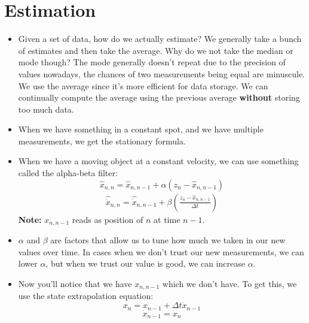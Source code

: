 \documentclass[a4paper, 11pt]{article}
\begin{document}
	\section{Estimation}
	\begin{itemize}
		\item Given a set of data, how do we actually estimate? We generally take a bunch of estimates and then take the average. Why do we not take the median or mode though?
		\subitem The mode generally doesn't repeat due to the precision of values nowadays, the chances of two measurements being equal are minuscule. 
		\subitem We use the average since it's more efficient for data storage. We can continually compute the average using the previous average \textbf{without} storing too much data.
		\item When we have something in a constant spot, and we have multiple measurements, we get the stationary formula.
		\item When we have a moving object at a constant velocity, we can use something called the alpha-beta filter:
		\begin{equation}
			\hat{x}_{n,n} = \hat{x}_{n,n-1} + \alpha (z_n-\hat{x}_{n,n-1})
		\end{equation}
		\begin{equation}
			\begin{split}
				\hat{\dot{x}}_{n,n} = \hat{\dot{x}}_{n,n-1} + \beta\left(\frac{z_n - \hat{x}_{n,n-1}}{\Delta t}\right)
			\end{split}
		\end{equation}
		\subitem \textbf{Note: }$x_{n,n-1}$ reads as position of $n$ at time $n-1$.
		\item $\alpha$ and $\beta$ are factors that allow us to tune how much we taken in our new values over time. In cases when we don't trust our new measurements, we can lower $\alpha$, but when we trust our value is good, we can increase $\alpha$.
		\item Now you'll notice that we have $x_{n,n-1}$ which we don't have. To get this, we use the state extrapolation equation:
		\begin{equation}
			x_n = x_{n-1} + \Delta t \dot{x}_{n-1}
		\end{equation}
		\begin{equation}
			\dot{x}_{n-1} = \dot{x}_n
		\end{equation}
	\end{itemize}
	
\end{document}
